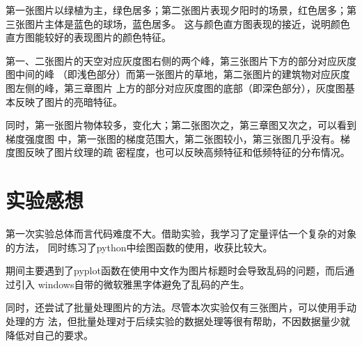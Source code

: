 \documentclass{article}
\begin{document}
    第一张图片以绿植为主，绿色居多；第二张图片表现夕阳时的场景，红色居多；第三张图片主体是蓝色的球场，蓝色居多。
    这与颜色直方图表现的接近，说明颜色直方图能较好的表现图片的颜色特征。


    第一、二张图片的天空对应灰度图右侧的两个峰，第三张图片下方的部分对应灰度图中间的峰
    （即浅色部分）而第一张图片的草地，第二张图片的建筑物对应灰度图左侧的峰，第三章图片
    上方的部分对应灰度图的底部（即深色部分），灰度图基本反映了图片的亮暗特征。

    同时，第一张图片物体较多，变化大；第二张图次之，第三章图又次之，可以看到梯度强度图
    中，第一张图的梯度范围大，第二张图较小，第三张图几乎没有。梯度图反映了图片纹理的疏
    密程度，也可以反映高频特征和低频特征的分布情况。

\section{实验感想}
    第一次实验总体而言代码难度不大。借助实验，我学习了定量评估一个复杂的对象的方法，
    同时练习了python中绘图函数的使用，收获比较大。

    期间主要遇到了pyplot函数在使用中文作为图片标题时会导致乱码的问题，而后通过引入
    windows自带的微软雅黑字体避免了乱码的产生。

    同时，还尝试了批量处理图片的方法。尽管本次实验仅有三张图片，可以使用手动处理的方
    法，但批量处理对于后续实验的数据处理等很有帮助，不因数据量少就降低对自己的要求。
    
\end{document}
